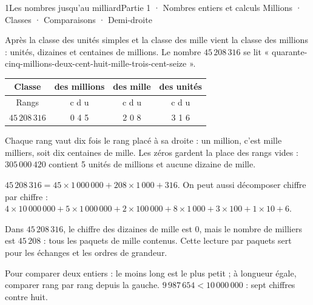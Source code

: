 \begin{ouverture}[calcul]{1}{Les nombres jusqu’au milliard}{Partie 1 · Nombres entiers et calculs}
{Millions · Classes · Comparaisons · Demi-droite}
\end{ouverture}
\pagestyle{otMain}\essentiel\fontsize{11}{15}\selectfont
{}\label{cours-1-1}
\begin{definition}Après la classe des unités simples et la classe des mille vient la classe des millions : unités, dizaines et centaines de millions. Le nombre $45\,208\,316$ se lit « quarante-cinq-millions-deux-cent-huit-mille-trois-cent-seize ».\end{definition}\begin{center}\renewcommand{\arraystretch}{1.35}\begin{tabular}{c|ccc}\toprule
Classe & des millions & des mille & des unités\\\midrule
Rangs & c d u & c d u & c d u\\
$45\,208\,316$ & 0 4 5 & 2 0 8 & 3 1 6\\
\bottomrule\end{tabular}\end{center}
\begin{propriete}Chaque rang vaut dix fois le rang placé à sa droite : un million, c’est mille milliers, soit dix centaines de mille. Les zéros gardent la place des rangs vides : $305\,000\,420$ contient 5 unités de millions et aucune dizaine de mille.\end{propriete}
\begin{exemple}$45\,208\,316=45\times1\,000\,000+208\times1\,000+316$. On peut aussi décomposer chiffre par chiffre : $4\times10\,000\,000+5\times1\,000\,000+2\times100\,000+8\times1\,000+3\times100+1\times10+6$.\end{exemple}
\begin{savoirfaire}Dans $45\,208\,316$, le chiffre des dizaines de mille est 0, mais le nombre de milliers est $45\,208$ : tous les paquets de mille contenus. Cette lecture par paquets sert pour les échanges et les ordres de grandeur.\end{savoirfaire}
\clearpage
{}\label{cours-1-2}
\begin{propriete}Pour comparer deux entiers : le moins long est le plus petit ; à longueur égale, comparer rang par rang depuis la gauche. $9\,987\,654<10\,000\,000$ : sept chiffres contre huit.\end{propriete}
\label{fig-cours-1-2-cours-droite-millions}

